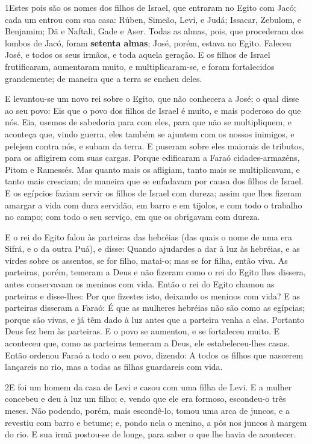 
\lettrine{1} Estes pois são os nomes dos filhos de Israel, que
entraram no Egito com Jacó; cada um entrou com sua casa: Rúben,
Simeão, Levi, e Judá; Issacar, Zebulom, e Benjamim; Dã e
Naftali, Gade e Aser. Todas as almas, pois, que procederam dos
lombos de Jacó, foram \textbf{setenta almas}; José, porém, estava no
Egito. Faleceu José, e todos os seus irmãos, e toda aquela
geração. E os filhos de Israel frutificaram, aumentaram muito, e
multiplicaram-se, e foram fortalecidos grandemente; de maneira que a
terra se encheu deles.

E levantou-se um novo rei sobre o Egito, que não conhecera a José;
o qual disse ao seu povo: Eis que o povo dos filhos de Israel é
muito, e mais poderoso do que nós. Eia, usemos de sabedoria
para com eles, para que não se multipliquem, e aconteça que, vindo
guerra, eles também se ajuntem com os nossos inimigos, e pelejem
contra nós, e subam da terra. E puseram sobre eles maiorais
de tributos, para os afligirem com suas cargas. Porque edificaram a
Faraó cidades-armazéns, Pitom e Ramessés. Mas quanto mais os
afligiam, tanto mais se multiplicavam, e tanto mais cresciam; de
maneira que se enfadavam por causa dos filhos de Israel. E os
egípcios faziam servir os filhos de Israel com dureza; assim
que lhes fizeram amargar a vida com dura servidão, em barro e em
tijolos, e com todo o trabalho no campo; com todo o seu serviço, em
que os obrigavam com dureza.

E o rei do Egito falou às parteiras das hebréias (das quais o
nome de uma era Sifrá, e o da outra Puá), e disse: Quando
ajudardes a dar à luz às hebréias, e as virdes sobre os assentos, se
for filho, matai-o; mas se for filha, então viva. As
parteiras, porém, temeram a Deus e não fizeram como o rei do Egito
lhes dissera, antes conservavam os meninos com vida. Então o
rei do Egito chamou as parteiras e disse-lhes: Por que fizestes
isto, deixando os meninos com vida? E as parteiras disseram a
Faraó: É que as mulheres hebréias não são como as egípcias; porque
são vivas, e já têm dado à luz antes que a parteira venha a elas.
Portanto Deus fez bem às parteiras. E o povo se aumentou, e
se fortaleceu muito. E aconteceu que, como as parteiras
temeram a Deus, ele estabeleceu-lhes casas. Então ordenou
Faraó a todo o seu povo, dizendo: A todos os filhos que nascerem
lançareis no rio, mas a todas as filhas guardareis com vida.

\medskip

\lettrine{2} E foi um homem da casa de Levi e casou com uma
filha de Levi. E a mulher concebeu e deu à luz um filho; e,
vendo que ele era formoso, escondeu-o três meses. Não podendo,
porém, mais escondê-lo, tomou uma arca de juncos, e a revestiu com
barro e betume; e, pondo nela o menino, a pôs nos juncos à margem do
rio. E sua irmã postou-se de longe, para saber o que lhe havia
de acontecer.

